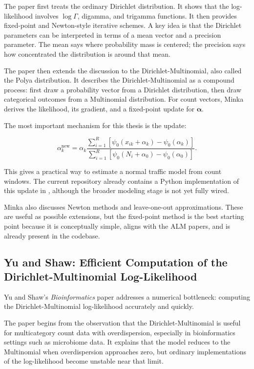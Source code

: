 \documentclass[11pt,a4paper]{article}
\begin{document}
The paper first treats the ordinary Dirichlet distribution. It shows that the log-likelihood involves \(\log\Gamma\), digamma, and trigamma functions. It then provides fixed-point and Newton-style iterative schemes. A key idea is that the Dirichlet parameters can be interpreted in terms of a mean vector and a precision parameter. The mean says where probability mass is centered; the precision says how concentrated the distribution is around that mean.

The paper then extends the discussion to the Dirichlet-Multinomial, also called the Polya distribution. It describes the Dirichlet-Multinomial as a compound process: first draw a probability vector from a Dirichlet distribution, then draw categorical outcomes from a Multinomial distribution. For count vectors, Minka derives the likelihood, its gradient, and a fixed-point update for \(\boldsymbol{\alpha}\).

The most important mechanism for this thesis is the update:

\[
\alpha_k^{\mathrm{new}}
=
\alpha_k
\frac{
\sum_{i=1}^{R}\left[\psi_0(x_{ik}+\alpha_k)-\psi_0(\alpha_k)\right]
}{
\sum_{i=1}^{R}\left[\psi_0(N_i+\alpha_0)-\psi_0(\alpha_0)\right]
}.
\]

This gives a practical way to estimate a normal traffic model from count windows. The current repository already contains a Python implementation of this update in , although the broader modeling stage is not yet fully wired.

Minka also discusses Newton methods and leave-one-out approximations. These are useful as possible extensions, but the fixed-point method is the best starting point because it is conceptually simple, aligns with the ALM papers, and is already present in the codebase.

\subsection{Yu and Shaw: Efficient Computation of the Dirichlet-Multinomial Log-Likelihood}

Yu and Shaw's \textit{Bioinformatics} paper addresses a numerical bottleneck: computing the Dirichlet-Multinomial log-likelihood accurately and quickly.

The paper begins from the observation that the Dirichlet-Multinomial is useful for multicategory count data with overdispersion, especially in bioinformatics settings such as microbiome data. It explains that the model reduces to the Multinomial when overdispersion approaches zero, but ordinary implementations of the log-likelihood become unstable near that limit.
\end{document}
